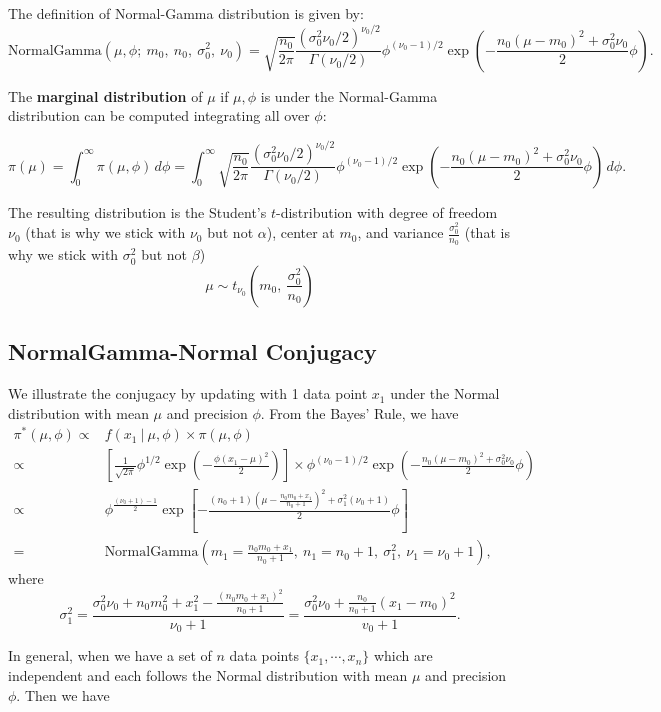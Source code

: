 \documentclass{article}
\def\dsst{\displaystyle}
\begin{document}
The definition of Normal-Gamma distribution is given by:
$$ \text{NormalGamma}(\mu, \phi;\ m_0,\ n_0,\ \sigma_0^2,\ \nu_0) = \sqrt{\frac{n_0}{2\pi}}\frac{(\sigma_0^2\nu_0/2)^{\nu_0/2}}{\Gamma(\nu_0/2)}\phi^{(\nu_0-1)/2}\exp\left(-\frac{n_0(\mu-m_0)^2+\sigma_0^2\nu_0}{2}\phi\right). $$

The \textbf{marginal distribution} of $\mu$ if $\mu,\phi$ is under the Normal-Gamma distribution can be computed integrating all over $\phi$:

$$\pi(\mu) = \int_0^\infty \pi(\mu, \phi)\, d\phi = \int_0^\infty \sqrt{\frac{n_0}{2\pi}}\frac{(\sigma_0^2\nu_0/2)^{\nu_0/2}}{\Gamma(\nu_0/2)}\phi^{(\nu_0-1)/2}\exp\left(-\frac{n_0(\mu-m_0)^2+\sigma_0^2\nu_0}{2}\phi\right)\, d\phi.$$

The resulting distribution is the Student's $t$-distribution with degree of freedom $\nu_0$ (that is why we stick with $\nu_0$ but not $\alpha$), center at $m_0$, and variance $\dsst \frac{\sigma_0^2}{n_0}$ (that is why we stick with $\sigma_0^2$ but not $\beta$)
$$ \mu\sim t_{\nu_0}\left(m_0,\ \frac{\sigma_0^2}{n_0}\right) $$

\subsection{NormalGamma-Normal Conjugacy}

We illustrate the conjugacy by updating with 1 data point $x_1$ under the Normal distribution with mean $\mu$ and precision $\phi$. From the Bayes' Rule, we have
\begin{align*}
\pi^*(\mu, \phi) \propto & f(x_1~|~\mu, \phi)\times \pi(\mu, \phi) \\
\propto & \left[\frac{1}{\sqrt{2\pi}}\phi^{1/2}\exp\left(-\frac{\phi(x_1-\mu)^2}{2}\right)\right]\times \phi^{(\nu_0-1)/2}\exp\left(-\frac{n_0(\mu-m_0)^2+\sigma_0^2\nu_0}{2}\phi\right)\\
\propto & \phi^{\frac{(\nu_0+1)-1}{2}}\exp\left[-\frac{(n_0+1)\left(\mu - \frac{n_0m_0+x_1}{n_0+1}\right)^2+\sigma_1^2(\nu_0+1)}{2}\phi\right]\\
= & \text{NormalGamma}(m_1 = \frac{n_0m_0+x_1}{n_0+1},\ n_1 = n_0+1,\ \sigma_1^2,\ \nu_1 = \nu_0+1),
\end{align*}
where
$$ \sigma_1^2 = \frac{\sigma_0^2\nu_0+n_0m_0^2+x_1^2-\frac{(n_0m_0+x_1)^2}{n_0+1}}{\nu_0+1} = \frac{\sigma_0^2\nu_0+\frac{n_0}{n_0+1}(x_1-m_0)^2}{v_0+1}. $$

In general, when we have a set of $n$ data points $\{x_1,\cdots,x_n\}$ which are independent and each follows the Normal distribution with mean $\mu$ and precision $\phi$. Then we have
\end{document}
